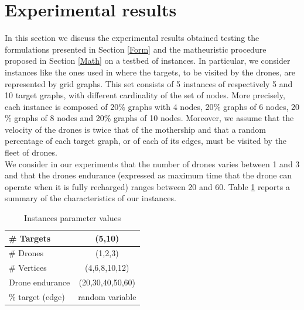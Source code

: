 \newpage
\section{Experimental results}


\noindent
In this section we discuss the experimental results obtained testing the formulations presented in Section \ref{Form} and the matheuristic procedure proposed in Section \ref{Math} on a testbed of instances. In particular, we consider instances like the ones used in \cite{art:Amorosi2021} where the targets, to be visited by the drones, are represented by grid graphs.
This set consists of 5 instances of respectively 5 and 10 target graphs, with different cardinality of the set of nodes. More precisely, each instance is composed of 20$\%$ graphs with 4 nodes, 20$\%$ graphs of 6 nodes, 20$\%$ graphs of 8 nodes and 20$\%$ graphs of 10 nodes. Moreover, we assume that the velocity of the drones is twice that of the mothership and that a random percentage of each target graph, or of each of its edges, must be visited by the fleet of drones.\\
We consider in our experiments that the number of drones varies between 1 and 3 and that the drones
endurance (expressed as maximum time that the drone can operate when it is fully recharged) ranges between 20 and 60.
Table \ref{table:tab1} reports a summary of the characteristics of our instances.

\renewcommand{\arraystretch}{0.7}
\begin{table}[!h]
\caption{Instances parameter values}
\centering
\footnotesize
\begin{tabular}{l | c }
\hline
\# Targets & (5,10)\\
\hline
\# Drones &	(1,2,3)\\
\hline
\# Vertices & (4,6,8,10,12)\\
\hline
Drone endurance & (20,30,40,50,60)\\
\hline
$\%$ target (edge) & random variable
\end{tabular}
\label{table:tab1}
\end{table}

